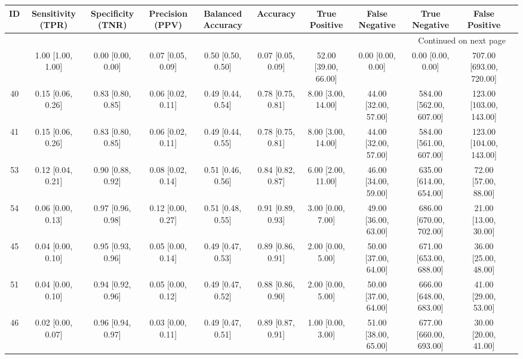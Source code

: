 \documentclass[8pt]{article}
\begin{document}
\begin{center}
\begin{footnotesize}
\begin{longtable}{|ccccccccccc|}
\toprule
 ID &  Sensitivity (TPR) &  Specificity (TNR) &    Precision (PPV) &  Balanced Accuracy &           Accuracy &         True Positive &        False Negative &            True Negative &           False Positive \\
\midrule
\endhead
\midrule
\multicolumn{10}{r}{{Continued on next page}} \\
\midrule
\endfoot

\bottomrule
\endlastfoot
 42 &  1.00 [1.00, 1.00] &  0.00 [0.00, 0.00] &  0.07 [0.05, 0.09] &  0.50 [0.50, 0.50] &  0.07 [0.05, 0.09] &  52.00 [39.00, 66.00] &     0.00 [0.00, 0.00] &        0.00 [0.00, 0.00] &  707.00 [693.00, 720.00] \\
 40 &  0.15 [0.06, 0.26] &  0.83 [0.80, 0.85] &  0.06 [0.02, 0.11] &  0.49 [0.44, 0.54] &  0.78 [0.75, 0.81] &    8.00 [3.00, 14.00] &  44.00 [32.00, 57.00] &  584.00 [562.00, 607.00] &  123.00 [103.00, 143.00] \\
 41 &  0.15 [0.06, 0.26] &  0.83 [0.80, 0.85] &  0.06 [0.02, 0.11] &  0.49 [0.44, 0.55] &  0.78 [0.75, 0.81] &    8.00 [3.00, 14.00] &  44.00 [32.00, 57.00] &  584.00 [561.00, 607.00] &  123.00 [104.00, 143.00] \\
 53 &  0.12 [0.04, 0.21] &  0.90 [0.88, 0.92] &  0.08 [0.02, 0.14] &  0.51 [0.46, 0.56] &  0.84 [0.82, 0.87] &    6.00 [2.00, 11.00] &  46.00 [34.00, 59.00] &  635.00 [614.00, 654.00] &     72.00 [57.00, 88.00] \\
 54 &  0.06 [0.00, 0.13] &  0.97 [0.96, 0.98] &  0.12 [0.00, 0.27] &  0.51 [0.48, 0.55] &  0.91 [0.89, 0.93] &     3.00 [0.00, 7.00] &  49.00 [36.00, 63.00] &  686.00 [670.00, 702.00] &     21.00 [13.00, 30.00] \\
 45 &  0.04 [0.00, 0.10] &  0.95 [0.93, 0.96] &  0.05 [0.00, 0.14] &  0.49 [0.47, 0.53] &  0.89 [0.86, 0.91] &     2.00 [0.00, 5.00] &  50.00 [37.00, 64.00] &  671.00 [653.00, 688.00] &     36.00 [25.00, 48.00] \\
 51 &  0.04 [0.00, 0.10] &  0.94 [0.92, 0.96] &  0.05 [0.00, 0.12] &  0.49 [0.47, 0.52] &  0.88 [0.86, 0.90] &     2.00 [0.00, 5.00] &  50.00 [37.00, 64.00] &  666.00 [648.00, 683.00] &     41.00 [29.00, 53.00] \\
 46 &  0.02 [0.00, 0.07] &  0.96 [0.94, 0.97] &  0.03 [0.00, 0.11] &  0.49 [0.47, 0.51] &  0.89 [0.87, 0.91] &     1.00 [0.00, 3.00] &  51.00 [38.00, 65.00] &  677.00 [660.00, 693.00] &     30.00 [20.00, 41.00] \\

\end{longtable}
\end{footnotesize}
\end{center}
\end{document}
